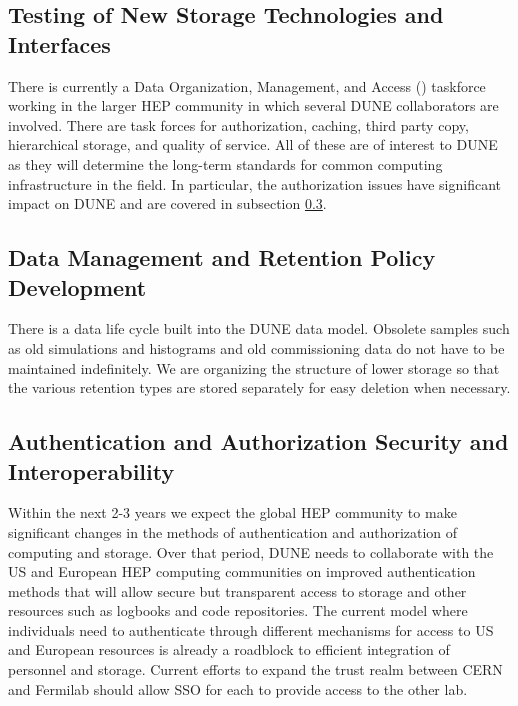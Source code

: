   \subsection{Testing of New Storage Technologies and Interfaces}

  There is currently a Data Organization, Management, and Access () taskforce working in the larger HEP community
  in which several DUNE collaborators are involved. There are task forces for authorization, caching, third party copy, hierarchical storage, and quality of service. All of these are of interest to DUNE as they will determine the long-term standards for common computing infrastructure in the field.
  In particular, the authorization issues have significant impact on DUNE and are covered in subsection \ref{ch-comp-auth}.


  \subsection{Data Management and Retention Policy Development}



  There is a data life cycle built into the DUNE data model.  Obsolete samples such as old simulations and histograms and old commissioning data do not have to be maintained indefinitely.
  We are organizing the structure of lower storage so that the various retention types are stored separately for easy deletion when necessary.

  \subsection{Authentication and Authorization Security and Interoperability}\label{ch-comp-auth}

  Within the next 2-3 years we expect the global HEP community to make significant changes in the methods of authentication and authorization of computing and storage.
  Over that period, DUNE needs to collaborate with the US and European HEP computing communities on improved authentication methods  that will allow secure but transparent access to storage and other resources such as logbooks and code repositories.  The current model where individuals need to authenticate through different mechanisms for access to US and European resources is already a roadblock to efficient integration  of personnel and storage.
  Current efforts to expand the trust realm between CERN and Fermilab should allow SSO  for each to provide access to the other lab.





